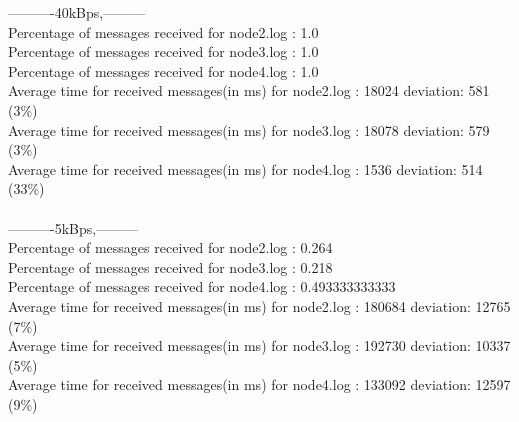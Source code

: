         ----------40kBps,---------\\
        Percentage of messages received for node2.log : 1.0\\
        Percentage of messages received for node3.log : 1.0\\
        Percentage of messages received for node4.log : 1.0\\
        Average time for received messages(in ms) for  node2.log : 18024 	deviation: 581 (3\%)\\
        Average time for received messages(in ms) for  node3.log : 18078 	deviation: 579 (3\%)\\
        Average time for received messages(in ms) for  node4.log : 1536 	deviation: 514 (33\%)\\\\
        ----------5kBps,---------\\
        Percentage of messages received for node2.log : 0.264\\
        Percentage of messages received for node3.log : 0.218\\
        Percentage of messages received for node4.log : 0.493333333333\\
        Average time for received messages(in ms) for  node2.log : 180684 	deviation: 12765 (7\%)\\
        Average time for received messages(in ms) for  node3.log : 192730 	deviation: 10337 (5\%)\\
        Average time for received messages(in ms) for  node4.log : 133092 	deviation: 12597 (9\%)
